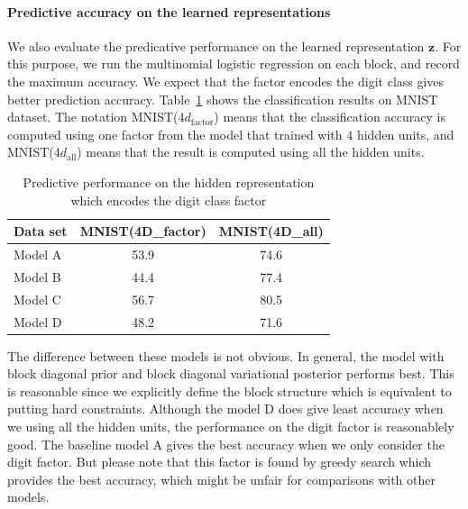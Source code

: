 \paragraph{Predictive accuracy on the learned representations}
We also evaluate the predicative performance on the learned representation $\mathbf{z}$. For this purpose, we run the multinomial logistic regression on each block, and record the maximum accuracy. We expect that the factor encodes the digit class gives better prediction accuracy. Table~\ref{tab:regression} shows the classification results on MNIST dataset. The notation MNIST($4d_{\text{factor}}$) means that the classification accuracy is computed using one factor from the model that trained with $4$ hidden units, and MNIST($4d_{\text{all}}$) means that the result is computed using all the hidden units.

\begin{table}[htb]
	\begin{center}
		\begin{small}
			\begin{sc}
				\begin{tabular}{lcc}
					\hline
					Data set & MNIST(4D\_factor) & MNIST(4D\_all)  \\
					\hline
					Model A& 53.9  & 74.6\\
					Model B &44.4 & 77.4\\
					Model C & 56.7 &80.5\\
					Model D & 48.2 & 71.6\\
					\hline
				\end{tabular}
			\end{sc}
		\end{small}
        \vspace{0.2cm}
		\caption{Predictive performance on the hidden representation which encodes the digit class factor}
\vspace{-0.5cm}		
\label{tab:regression}
	\end{center}
\end{table}

The difference between these models is not obvious. In general, the model with block diagonal prior and block diagonal variational posterior performs best. This is reasonable since we explicitly define the block structure which is equivalent to putting hard constraints. Although the model D does give least accuracy when we using all the hidden units, the performance on the digit factor is reasonablely good. The baseline model A gives the best accuracy when we only consider the digit factor. But please note that this factor is found by greedy search which provides the best accuracy, which might be unfair for comparisons with other models.

